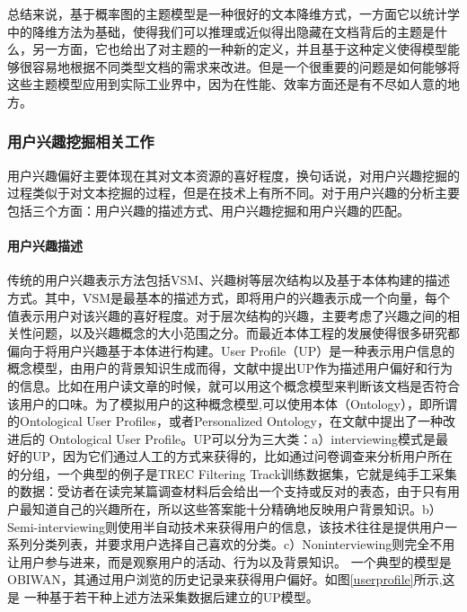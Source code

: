 总结来说，基于概率图的主题模型是一种很好的文本降维方式，一方面它以统计学中的降维方法为基础，使得我们可以推理或近似得出隐藏在文档背后的主题是什么，另一方面，它也给出了对主题的一种新的定义，并且基于这种定义使得模型能够很容易地根据不同类型文档的需求来改进。但是一个很重要的问题是如何能够将这些主题模型应用到实际工业界中，因为在性能、效率方面还是有不尽如人意的地方。

\subsubsection{用户兴趣挖掘相关工作}
用户兴趣偏好主要体现在其对文本资源的喜好程度，换句话说，对用户兴趣挖掘的过程类似于对文本挖掘的过程，但是在技术上有所不同。对于用户兴趣的分析主要包括三个方面：用户兴趣的描述方式、用户兴趣挖掘和用户兴趣的匹配。

\paragraph{用户兴趣描述}
传统的用户兴趣表示方法包括VSM\cite{gong2012personalized}、兴趣树等层次结构\cite{kim2003learning}以及基于本体构建的描述方式。其中，VSM是最基本的描述方式，即将用户的兴趣表示成一个向量，每个值表示用户对该兴趣的喜好程度。对于层次结构的兴趣，主要考虑了兴趣之间的相关性问题，以及兴趣概念的大小范围之分。而最近本体工程的发展使得很多研究都偏向于将用户兴趣基于本体进行构建。User Profile（UP）是一种表示用户信息的概念模型，由用户的背景知识生成而得，文献\cite{li2006mining,tao2011personalized}中提出UP作为描述用户偏好和行为的信息。比如在用户读文章的时候，就可以用这个概念模型来判断该文档是否符合该用户的口味。为了模拟用户的这种概念模型,可以使用本体（Ontology），即所谓的Ontological User Profiles\cite{pretschner1999ontology,sieg2007web}，或者Personalized Ontology\cite{tao2007ontology}，在文献\cite{trajkova2004improving}中提出了一种改进后的 Ontological User Profile。UP可以分为三大类：a）interviewing模式是最好的UP，因为它们通过人工的方式来获得的，比如通过问卷调查来分析用户所在的分组，一个典型的例子是TREC Filtering Track训练数据集，它就是纯手工采集的数据：受访者在读完某篇调查材料后会给出一个支持或反对的表态，由于只有用户最知道自己的兴趣所在，所以这些答案能十分精确地反映用户背景知识。b）Semi-interviewing则使用半自动技术来获得用户的信息，该技术往往是提供用户一系列分类列表，并要求用户选择自己喜欢的分类。c）Noninterviewing则完全不用让用户参与进来，而是观察用户的活动、行为以及背景知识。 一个典型的模型是OBIWAN，其通过用户浏览的历史记录来获得用户偏好。如图\ref{userprofile}所示,这是 一种基于若干种上述方法采集数据后建立的UP模型\cite{sieg2007learning}。

